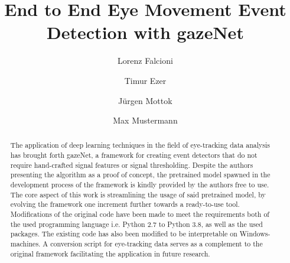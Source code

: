 \documentclass[acmlarge]{acmart}
\begin{document}
\title{End to End Eye Movement Event Detection with gazeNet}

\author{Lorenz Falcioni}

\author{Timur Ezer}

\author{Jürgen Mottok}

\author{Max Mustermann}

\begin{abstract}
    The application of deep learning techniques in the field of eye-tracking data analysis has brought forth gazeNet, a framework for creating event detectors that do not require hand-crafted signal features or signal thresholding. Despite the authors presenting the algorithm as a proof of concept, the pretrained model spawned in the development process of the  framework is kindly provided by the authors free to use. The core aspect of this work is streamlining the usage of said pretrained model, by evolving the framework one increment further towards a ready-to-use tool. Modifications of the original code have been made to meet the requirements both of the used programming language i.e. Python 2.7 to Python 3.8, as well as the used packages. The existing code has also been modified to be interpretable on Windows-machines. A conversion script for eye-tracking data serves as a complement to the original framework facilitating the application in future research.
\end{abstract}

\maketitle


\end{document}
